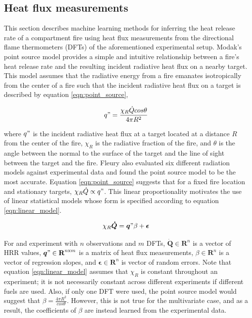 \documentclass{article}
\begin{document}
\subsection{Heat flux measurements}
This section describes machine learning methods for inferring the heat release rate of a compartment fire using heat flux measurements from the directional flame thermometers (DFTs) of the aforementioned experimental setup. Modak's point source model \cite{modak1977thermal} provides a simple and intuitive relationship between a fire's heat release rate and the resulting incident radiative heat flux on a nearby target. This model assumes that the radiative energy from a fire emanates isotropically from the center of a fire such that the incident radiative heat flux on a target is described by equation \ref{eqn:point_source},

 \begin{equation}
  \label{eqn:point_source}
  q" = \frac{\chi_R\dot{Q}cos\theta}{4\pi R^2}
\end{equation}

where $q"$ is the incident radiative heat flux at a target located at a distance $R$ from the center of the fire, $\chi_R$ is the radiative fraction of the fire, and $\theta$ is the angle between the normal to the surface of the target and the line of sight between the target and the fire. Fleury \cite{fleury2010evaluation} also evaluated six different radiation models against experimental data and found the point source model to be the most accurate. Equation \ref{eqn:point_source} suggests that for a fixed fire location and stationary targets, $\chi_R \dot{Q} \propto q"$. This linear proportionality motivates the use of linear statistical models whose form is specified according to equation \ref{eqn:linear_model}.

 \begin{equation}
  \label{eqn:linear_model}
  \chi_R  \boldsymbol{\dot{Q}} = \boldsymbol{q}" \beta + \boldsymbol{\epsilon}
\end{equation}

For and experiment with $n$ observations and $m$ DFTs, $\boldsymbol{\dot{Q}} \in  \textbf{R}^n$ is a vector of HRR values, $\boldsymbol{q}" \in \textbf{R}^{n\text{x}m}$ is a matrix of heat flux measurements, $\beta \in \textbf{R}^n$ is a vector of regression slopes, and $\boldsymbol{\epsilon} \in \textbf{R}^n$ is vector of random errors. Note that equation \ref{eqn:linear_model} assumes that $\chi_R$ is constant throughout an experiment; it is not necessarily constant across different experiments if different fuels are used. Also, if only one DFT were used, the point source model would suggest that $\beta = \frac{4 \pi R^2}{ cos \theta}$. However, this is not true for the multivariate case, and as a result, the coefficients of $\beta$ are instead learned from the experimental data. 
\end{document}
